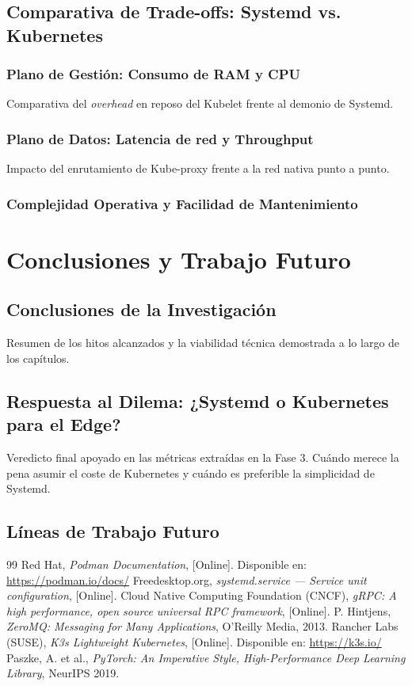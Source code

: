\documentclass[11pt, a4paper]{report}
\begin{document}
\section{Comparativa de Trade-offs: Systemd vs. Kubernetes}
\subsection{Plano de Gestión: Consumo de RAM y CPU}
Comparativa del \textit{overhead} en reposo del Kubelet frente al demonio de Systemd.
\subsection{Plano de Datos: Latencia de red y Throughput}
Impacto del enrutamiento de Kube-proxy frente a la red nativa punto a punto.
\subsection{Complejidad Operativa y Facilidad de Mantenimiento}

\chapter{Conclusiones y Trabajo Futuro}

\section{Conclusiones de la Investigación}
Resumen de los hitos alcanzados y la viabilidad técnica demostrada a lo largo de los capítulos.

\section{Respuesta al Dilema: ¿Systemd o Kubernetes para el Edge?}
Veredicto final apoyado en las métricas extraídas en la Fase 3. Cuándo merece la pena asumir el coste de Kubernetes y cuándo es preferible la simplicidad de Systemd.

\section{Líneas de Trabajo Futuro}

\vspace{1cm}

\begin{thebibliography}{99}
 Red Hat, \textit{Podman Documentation}, [Online]. Disponible en: \url{https://podman.io/docs/}
 Freedesktop.org, \textit{systemd.service — Service unit configuration}, [Online].
 Cloud Native Computing Foundation (CNCF), \textit{gRPC: A high performance, open source universal RPC framework}, [Online].
 P. Hintjens, \textit{ZeroMQ: Messaging for Many Applications}, O'Reilly Media, 2013.
 Rancher Labs (SUSE), \textit{K3s Lightweight Kubernetes}, [Online]. Disponible en: \url{https://k3s.io/}
 Paszke, A. et al., \textit{PyTorch: An Imperative Style, High-Performance Deep Learning Library}, NeurIPS 2019.
\end{thebibliography}
\end{document}
